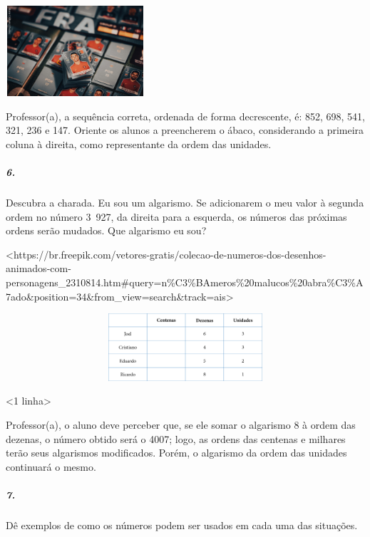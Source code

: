 \includegraphics[width=2.03125in,height=1.32438in]{media/image17.png}

Professor(a), a sequência correta, ordenada de forma decrescente, é: 852,
698, 541, 321, 236 e 147. Oriente os alunos a preencherem o ábaco,
considerando a primeira coluna à direita, como representante da ordem
das unidades.

\subparagraph{6. }\label{section-5}

Descubra a charada. Eu sou um algarismo. Se adicionarem o meu valor à
segunda ordem no número 3~927, da direita para a esquerda, os números das próximas
ordens serão mudados. Que algarismo eu sou?

\textless{}https://br.freepik.com/vetores-gratis/colecao-de-numeros-dos-desenhos-animados-com-personagens\_2310814.htm\#query=n\%C3\%BAmeros\%20malucos\%20abra\%C3\%A7ado\&position=34\&from\_view=search\&track=ais\textgreater{}

\includegraphics[width=5.90556in,height=0.98611in]{media/image18.png}

\textless{}1 linha\textgreater{}

Professor(a), o aluno deve perceber que, se ele somar o algarismo 8 à
ordem das dezenas, o número obtido será o 4007; logo, as ordens das
centenas e milhares terão seus algarismos modificados. Porém, o
algarismo da ordem das unidades continuará o mesmo.

\subparagraph{7. }\label{section-6}

Dê exemplos de como os números podem ser usados em cada uma das
situações.

